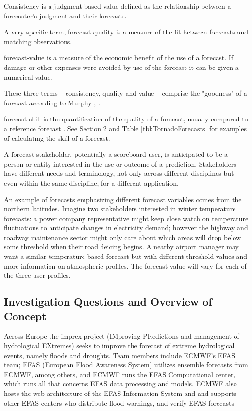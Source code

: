 \documentclass[logos,parttoc,morelanguage=french,morelanguage=german,draft]{orsay-memoire}
\begin{document}
Consistency is a judgment-based value defined as the relationship between a forecaster's judgment and their forecasts.

A very specific term, \gls{forecast-quality} is a measure of the fit between forecasts and matching observations. 

\gls{forecast-value} is a measure of the economic benefit of the use of a forecast. If damage or other expenses were avoided by use of the forecast it can be given a numerical value.

These three terms -- consistency, quality and value -- comprise the "goodness" of a forecast according to Murphy  \autocite{JolliffeIanT.andStephenson2012ForecastVerification}, \autocite{murphy1993good}.

\gls{forecast-skill} is the quantification of the quality of a forecast, usually compared to a reference forecast \autocite{JolliffeIanT.andStephenson2012ForecastVerification}. See Section 2 and Table \ref{tbl:TornadoForecasts} for examples of calculating the skill of a forecast.

A forecast stakeholder, potentially a \gls{scoreboard-user}, is anticipated to be a person or entity interested in the use or outcome of a prediction. Stakeholders have different needs and terminology, not only across different disciplines but even within the same discipline, for a different application.

An example of forecasts emphasizing different forecast variables comes from the northern latitudes. Imagine two stakeholders interested in winter temperature forecasts: a power company representative might keep close watch on temperature fluctuations to anticipate changes in electricity demand; however the highway and roadway maintenance sector might only care about which areas will drop below some threshold when their road deicing begins. A nearby airport manager may want a similar temperature-based forecast but with different threshold values and more information on atmospheric profiles. The \gls{forecast-value} will vary for each of the three user profiles.
 
\subsection{Investigation Questions and Overview of Concept}

Across Europe the \gls{imprex} project ({IM}proving {PR}edictions and management of hydrological {EX}tremes) seeks to improve the forecast of extreme hydrological events, namely floods and droughts. Team members include ECMWF's \gls{EFAS} team; EFAS (European Flood Awareness System) utilizes ensemble forecasts from ECMWF, among others, and ECMWF runs the EFAS Computational center, which runs all that concerns EFAS data processing and models. ECMWF also hosts the web architecture of the EFAS Information System and and supports other EFAS centers who distribute flood warnings, and verify EFAS forecasts.
\end{document}
